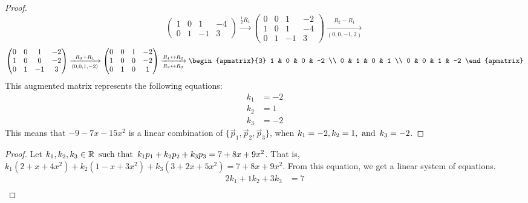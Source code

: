 \documentclass{article}
\begin{document}
\begin{enumerate}
\begin{proof}
\[\begin{pmatrix}
                1 & 0 & 1  & -4 \\
                0 & 1 & -1 & 3
            \end{pmatrix} \xrightarrow{\frac{1}{2}R_1}
            \begin{pmatrix}
                0 & 0 & 1  & -2 \\
                1 & 0 & 1  & -4 \\
                0 & 1 & -1 & 3
            \end{pmatrix} \xrightarrow[(0,0,-1,2)]{R_2 - R_1}
        \]
        \[
            \begin{pmatrix}
                0 & 0 & 1  & -2 \\
                1 & 0 & 0  & -2 \\
                0 & 1 & -1 & 3
            \end{pmatrix} \xrightarrow[(0,0,1,-2)]{R_3 + R_1}
            \begin{pmatrix}
                0 & 0 & 1 & -2 \\
                1 & 0 & 0 & -2 \\
                0 & 1 & 0 & 1
            \end{pmatrix} \xrightarrow[R_2 \leftrightarrow R_3]{R_1 \leftrightarrow R_2}
            \begin{apmatrix}{3}
                1 & 0 & 0 & -2 \\
                0 & 1 & 0 & 1 \\
                0 & 0 & 1 & -2
            \end{apmatrix}
        \]
        This augmented matrix represents the following equations:
        \begin{align*}
            k_1 & = -2 \\
            k_2 & = 1  \\
            k_3 & = -2
        \end{align*}
        This means that $-9-7x-15x^2$ is a linear combination of $\{\vec{p}_1,\vec{p}_2,\vec{p}_3\}$, when $k_1 = -2, k_2 = 1, \operatorname{~\text{and}~} k_3 = -2$.
    \end{proof}
    \begin{proof}
        Let $k_1,k_2,k_3 \in \mathbb{R} \operatorname{~\text{such that}~} k_1p_1 + k_2p_2 + k_3p_3 = 7+8x+9x^2$. That is, $k_1(2 + x + 4x^2) + k_2(1 - x + 3x^2) + k_3(3 + 2x + 5x^2) = 7+8x+9x^2$. From this equation, we get a linear system of equations.
        \begin{align*}
            2k_1 + 1k_2 + 3k_3 & = 7 \\

\end{align*}
\end{proof}
\end{enumerate}
\end{document}
